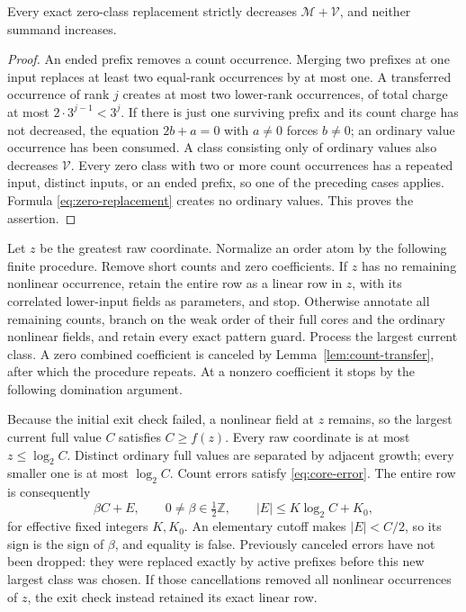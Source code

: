 \begin{lemma}\label{lem:inner-termination}
Every exact zero-class replacement strictly decreases
\(\mathcal M+\mathcal V\), and neither summand increases.
\end{lemma}
\begin{proof}
An ended prefix removes a count occurrence. Merging two prefixes at
one input replaces at least two equal-rank occurrences by at most one.
A transferred occurrence of rank \(j\) creates at most two lower-rank
occurrences, of total charge at most
\(2\cdot3^{j-1}<3^j\). If there is just one surviving prefix and
its count charge has not decreased, the equation \(2b+a=0\) with
\(a\ne0\) forces \(b\ne0\); an ordinary value occurrence has
been consumed. A class consisting only of ordinary values also decreases
\(\mathcal V\). Every zero class with two or more count occurrences
has a repeated input, distinct inputs, or an ended prefix, so one of
the preceding cases applies. Formula \eqref{eq:zero-replacement} creates
no ordinary values. This proves the assertion.
\end{proof}

Let \(z\) be the greatest raw coordinate. Normalize an order atom by
the following finite procedure. Remove short counts and zero coefficients.
If \(z\) has no remaining nonlinear occurrence, retain the entire row
as a linear row in \(z\), with its correlated lower-input fields as
parameters, and stop. Otherwise annotate all remaining counts, branch on
the weak order of their full cores and the ordinary nonlinear fields,
and retain every exact pattern guard. Process the largest current class.
A zero combined coefficient is canceled by Lemma~\ref{lem:count-transfer},
after which the procedure repeats. At a nonzero coefficient it stops by
the following domination argument.

Because the initial exit check failed, a nonlinear field at \(z\)
remains, so the largest current full value \(C\) satisfies \(C\ge f(z)\).
Every raw coordinate is at most \(z\le\log_2 C\). Distinct ordinary
full values are separated by adjacent growth; every smaller one is at
most \(\log_2 C\). Count errors satisfy \eqref{eq:core-error}.
The entire row is consequently
\[
 \beta C+E,\qquad 0\ne\beta\in\tfrac12\mathbb Z,
 \qquad |E|\le K\log_2 C+K_0,
\]
for effective fixed integers \(K,K_0\). An elementary cutoff makes
\(|E|<C/2\), so its sign is the sign of \(\beta\), and equality is
false. Previously canceled errors have not been dropped: they were
replaced exactly by active prefixes before this new largest class was
chosen. If those cancellations removed all nonlinear occurrences of
\(z\), the exit check instead retained its exact linear row.

